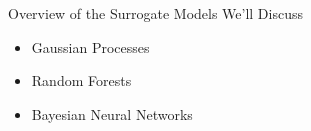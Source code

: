 {\begin{columns}[T]
\begin{column}{.48\textwidth}
    \end{column}%
    \end{columns}
}

\begin{frame}[c]{Overview of the Surrogate Models We'll Discuss}

\begin{itemize}
	\item Gaussian Processes 
	\item Random Forests 
	\item Bayesian Neural Networks 

\end{itemize}

%
%
%
%
%  
%
%


\end{frame}
